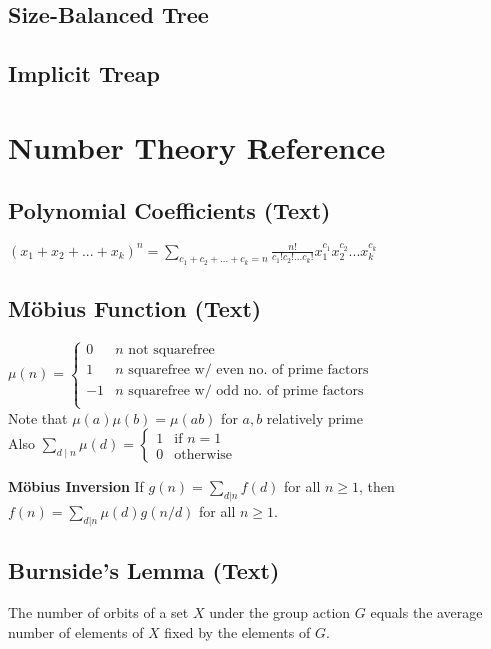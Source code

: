 \documentclass[9pt]{extarticle}
\begin{document}
\begin{multicols*}{3}
\subsection{Size-Balanced Tree}


\subsection{Implicit Treap}


\section{Number Theory Reference}
\subsection{Polynomial Coefficients (Text)} %
$(x_1 + x_2 + ... + x_k)^n = \sum_{c_1 + c_2 + ... + c_k = n}
\frac{n!}{c_1! c_2! ... c_k!} x_1^{c_1} x_2^{c_2} ... x_k^{c_k}$

\subsection{M\"obius Function (Text)} %
$\mu(n) = \begin{cases}
0 & \text{$n$ not squarefree} \\
1 & \text{$n$ squarefree w/ even no. of prime factors} \\
-1 & \text{$n$ squarefree w/ odd no. of prime factors} \\
\end{cases}$ \\
Note that $\mu(a) \mu(b) = \mu(ab)$ for $a, b$ relatively prime \\
Also $\sum_{d \mid n} \mu(d) = \begin{cases} 1 & \text{if $n = 1$} \\
0 & \text{otherwise} \end{cases}$

\textbf{M\"obius Inversion}
If $g(n) = \sum_{d|n} f(d)$ for all $n \ge 1$, then
$f(n) = \sum_{d|n} \mu(d)g(n/d)$ for all $n \ge 1$.

\subsection{Burnside's Lemma (Text)} %
The number of orbits of a set $X$ under the group action $G$ equals the average
number of elements of $X$ fixed by the elements of $G$.


\end{multicols*}
\end{document}
